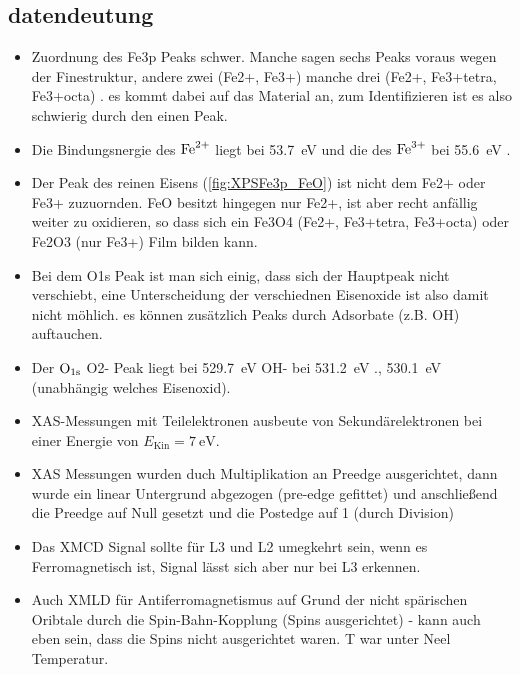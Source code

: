     \subsection{datendeutung}
        \begin{itemize}
            \item Zuordnung des Fe3p Peaks schwer. Manche sagen sechs Peaks voraus \cite{FeO_14, FeO_17, FeO_15} wegen der Finestruktur, andere zwei (Fe2+, Fe3+) \cite{FeO_15, FeO_11, FeO_10, FeO_7} manche drei (Fe2+, Fe3+tetra, Fe3+octa) \cite{FeO_12}. es kommt dabei auf das Material an, zum Identifizieren ist es also schwierig durch den einen Peak.
            \item Die Bindungsnergie des $\ce{Fe}^{2+}$ liegt bei \SI{53.7}{\electronvolt} und die des $\ce{Fe}^{3+}$ bei \SI{55.6}{\electronvolt} \cite{FeO_7}.
            \item Der Peak des reinen Eisens (\autoref{fig:XPSFe3p_FeO}) ist nicht dem Fe2+ oder Fe3+ zuzuornden. FeO besitzt hingegen nur Fe2+, ist aber recht anfällig weiter zu oxidieren, so dass sich ein Fe3O4 (Fe2+, Fe3+tetra, Fe3+octa) oder Fe2O3 (nur Fe3+) Film bilden kann. 
            \item Bei dem O1s Peak ist man sich einig, dass sich der Hauptpeak nicht verschiebt, eine Unterscheidung der verschiednen Eisenoxide ist also damit nicht möhlich. es können zusätzlich Peaks durch Adsorbate (z.B. OH) auftauchen.
            \item Der  $\ce{O}_{1\text{s}}$ O2- Peak liegt bei \SI{529.7}{\electronvolt} \cite{FeO_9} OH- bei \SI{531.2}{\electronvolt} \cite{FeO_9}., \SI{530.1}{\electronvolt} \cite{FeO_15} (unabhängig welches Eisenoxid).
            \item XAS-Messungen mit Teilelektronen ausbeute von Sekundärelektronen bei einer Energie von $E_\text{Kin} = \SI{7}{\electronvolt}$.
            \item XAS Messungen wurden duch Multiplikation an Preedge ausgerichtet, dann wurde ein linear Untergrund abgezogen (pre-edge gefittet) und anschließend die Preedge auf Null gesetzt und die Postedge auf 1 (durch Division)
            \item Das XMCD Signal sollte für L3 und L2 umegkehrt sein, wenn es Ferromagnetisch ist, Signal lässt sich aber nur bei L3 erkennen.
            \item Auch XMLD für Antiferromagnetismus auf Grund der nicht spärischen Oribtale durch die Spin-Bahn-Kopplung (Spins ausgerichtet) \cite{stohr_magnetism_2006} - kann auch eben sein, dass die Spins nicht ausgerichtet waren. T war unter Neel Temperatur.

\end{itemize}
